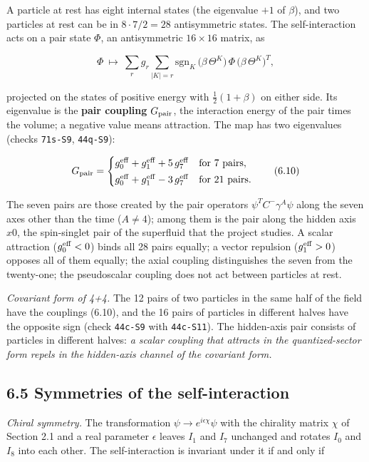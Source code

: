 \documentclass[
  10pt,
]{article}
\begin{document}
A particle at rest has eight internal states (the eigenvalue \(+1\) of
\(\beta\)), and two particles at rest can be in \(8\cdot7/2=28\)
antisymmetric states. The self-interaction acts on a pair state
\(\Phi\), an antisymmetric \(16\times16\) matrix, as

\[\Phi\ \mapsto\ \sum_{r}g_r\sum_{|K|=r}\mathrm{sgn}_K\,\big(\beta\,\Theta^K\big)\,\Phi\,\big(\beta\,\Theta^K\big)^T,\tag{6.9}\]

projected on the states of positive energy with \(\tfrac12(1+\beta)\) on
either side. Its eigenvalue is the \textbf{pair coupling}
\(G_{\rm pair}\), the interaction energy of the pair times the volume; a
negative value means attraction. The map has two eigenvalues (checks
\texttt{71s-S9}, \texttt{44q-S9}):

\[G_{\rm pair}=\begin{cases}g_0^{\rm eff}+g_1^{\rm eff}+5\,g_7^{\rm eff}&\text{for 7 pairs},\\[2pt]
g_0^{\rm eff}+g_1^{\rm eff}-3\,g_7^{\rm eff}&\text{for 21 pairs}.\end{cases}\tag{6.10}\]

The seven pairs are those created by the pair operators
\(\psi^TC^-\gamma^A\psi\) along the seven axes other than the time
(\(A\neq4\)); among them is the pair along the hidden axis \(x0\), the
spin-singlet pair of the superfluid that the project studies. A scalar
attraction (\(g_0^{\rm eff}<0\)) binds all 28 pairs equally; a vector
repulsion (\(g_1^{\rm eff}>0\)) opposes all of them equally; the axial
coupling distinguishes the seven from the twenty-one; the pseudoscalar
coupling does not act between particles at rest.

\emph{Covariant form of 4+4.} The 12 pairs of two particles in the same
half of the field have the couplings (6.10), and the 16 pairs of
particles in different halves have the opposite sign (check
\texttt{44c-S9} with \texttt{44c-S11}). The hidden-axis pair consists of
particles in different halves: \emph{a scalar coupling that attracts in
the quantized-sector form repels in the hidden-axis channel of the
covariant form.}

\hypertarget{symmetries-of-the-self-interaction}{%
\subsection{6.5 Symmetries of the
self-interaction}\label{symmetries-of-the-self-interaction}}

\emph{Chiral symmetry.} The transformation
\(\psi\to e^{i\epsilon\chi}\psi\) with the chirality matrix \(\chi\) of
Section 2.1 and a real parameter \(\epsilon\) leaves \(I_1\) and \(I_7\)
unchanged and rotates \(I_0\) and \(I_8\) into each other. The
self-interaction is invariant under it if and only if
\end{document}
